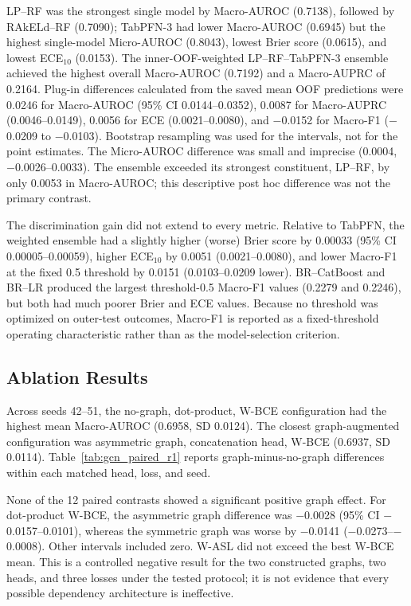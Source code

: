 \documentclass{ieeeaccess}
\begin{document}


LP--RF was the strongest single model by Macro-AUROC (0.7138), followed by RAkELd--RF (0.7090); TabPFN-3 had lower Macro-AUROC (0.6945) but the highest single-model Micro-AUROC (0.8043), lowest Brier score (0.0615), and lowest ECE$_{10}$ (0.0153). The inner-OOF-weighted LP--RF--TabPFN-3 ensemble achieved the highest overall Macro-AUROC (0.7192) and a Macro-AUPRC of 0.2164. Plug-in differences calculated from the saved mean OOF predictions were 0.0246 for Macro-AUROC (95\% CI 0.0144--0.0352), 0.0087 for Macro-AUPRC (0.0046--0.0149), 0.0056 for ECE (0.0021--0.0080), and $-$0.0152 for Macro-F1 ($-$0.0209 to $-$0.0103). Bootstrap resampling was used for the intervals, not for the point estimates. The Micro-AUROC difference was small and imprecise (0.0004, $-$0.0026--0.0033). The ensemble exceeded its strongest constituent, LP--RF, by only 0.0053 in Macro-AUROC; this descriptive post hoc difference was not the primary contrast.

The discrimination gain did not extend to every metric. Relative to TabPFN, the weighted ensemble had a slightly higher (worse) Brier score by 0.00033 (95\% CI 0.00005--0.00059), higher ECE$_{10}$ by 0.0051 (0.0021--0.0080), and lower Macro-F1 at the fixed 0.5 threshold by 0.0151 (0.0103--0.0209 lower). BR--CatBoost and BR--LR produced the largest threshold-0.5 Macro-F1 values (0.2279 and 0.2246), but both had much poorer Brier and ECE values. Because no threshold was optimized on outer-test outcomes, Macro-F1 is reported as a fixed-threshold operating characteristic rather than as the model-selection criterion.

\subsection{Ablation Results}

Across seeds 42--51, the no-graph, dot-product, W-BCE configuration had the highest mean Macro-AUROC (0.6958, SD 0.0124). The closest graph-augmented configuration was asymmetric graph, concatenation head, W-BCE (0.6937, SD 0.0114). Table~\ref{tab:gcn_paired_r1} reports graph-minus-no-graph differences within each matched head, loss, and seed.



None of the 12 paired contrasts showed a significant positive graph effect. For dot-product W-BCE, the asymmetric graph difference was $-$0.0028 (95\% CI $-$0.0157--0.0101), whereas the symmetric graph was worse by $-$0.0141 ($-$0.0273--$-$0.0008). Other intervals included zero. W-ASL did not exceed the best W-BCE mean. This is a controlled negative result for the two constructed graphs, two heads, and three losses under the tested protocol; it is not evidence that every possible dependency architecture is ineffective.
\end{document}
